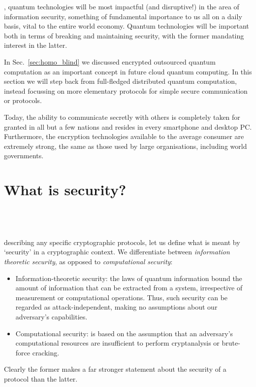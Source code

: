 %
%

\newline

, quantum technologies will be most impactful (and disruptive!) in the area of information security, something of fundamental importance to us all on a daily basis, vital to the entire world economy. Quantum technologies will be important both in terms of breaking and maintaining security, with the former mandating interest in the latter.

In Sec.~\ref{sec:homo_blind} we discussed encrypted outsourced quantum computation as an important concept in future cloud quantum computing. In this section we will step back from full-fledged distributed quantum computation, instead focussing on more elementary protocols for simple secure communication or protocols.

Today, the ability to communicate secretly with others is completely taken for granted in all but a few nations and resides in every smartphone and desktop PC. Furthermore, the encryption technologies available to the average consumer are extremely strong, the same as those used by large organisations, including world governments.

%
%

\section{What is security?}\label{sec:comp_vs_inf_th_sec}

\\
\\
\\

 describing any specific cryptographic protocols, let us define what is meant by `security' in a cryptographic context. We differentiate between \textit{information theoretic security}, as opposed to \textit{computational security}:

\begin{itemize}
	\item Information-theoretic security: the laws of quantum information bound the amount of information that can be extracted from a system, irrespective of measurement or computational operations. Thus, such security can be regarded as attack-independent, making no assumptions about our adversary's capabilities.
	\item Computational security: is based on the assumption that an adversary's computational resources are insufficient to perform cryptanalysis or brute-force cracking.
\end{itemize}
Clearly the former makes a far stronger statement about the security of a protocol than the latter.

